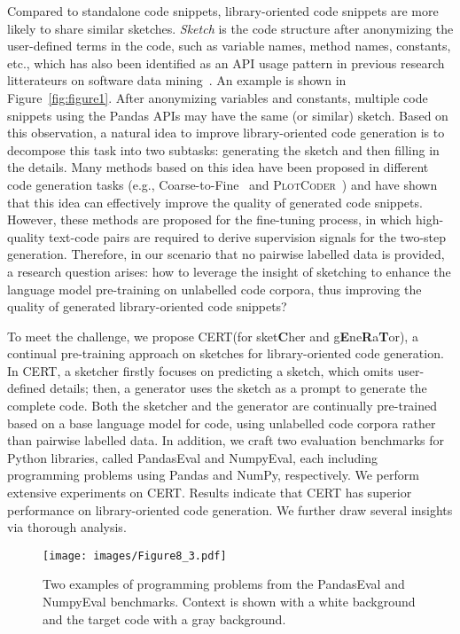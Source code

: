 \documentclass{article}
\newcommand{\cert}{\textsc{CERT}\xspace}
\newcommand{\peval}{PandasEval\xspace}
\newcommand{\neval}{NumpyEval\xspace}
\newcommand{\pandas}{Pandas\xspace}
\newcommand{\numpy}{NumPy\xspace}
\begin{document}
Compared to standalone code snippets, library-oriented code snippets are more likely to share similar sketches.
\emph{Sketch} is the code structure after anonymizing the user-defined terms in the code, such as variable names, method names, constants, etc., which has also been identified as an API usage pattern in previous research litterateurs on software data mining~\cite{ZhongECOOP2009,Wang2013-MSR,NIU2017127}.
An example is shown in Figure~\ref{fig:figure1}. After anonymizing variables and constants, multiple code snippets using the \pandas APIs may have the same (or similar) sketch.
Based on this observation, a natural idea to improve library-oriented code generation is to decompose this task into two subtasks: generating the sketch and then filling in the details.
Many methods based on this idea have been proposed in different code generation tasks (e.g., Coarse-to-Fine~\cite{dong2018coarse} and \textsc{PlotCoder}~\cite{chen2021plotcoder}) and have shown that this idea can effectively improve the quality of generated code snippets.
However, these methods are proposed for the fine-tuning process, in which high-quality text-code pairs are required to derive supervision signals for the two-step generation.
Therefore, in our scenario that no pairwise labelled data is provided, a research question arises: how to leverage the insight of sketching to enhance the language model pre-training on unlabelled code corpora, thus improving the quality of generated library-oriented code snippets?

To meet the challenge, we propose \cert (for sket\textbf{C}her and  g\textbf{E}ne\textbf{R}a\textbf{T}or), a continual pre-training approach on sketches for library-oriented code generation. In \cert, a sketcher firstly focuses on predicting a sketch, which omits user-defined details; then, a generator uses the sketch as a prompt to generate the complete code. Both the sketcher and the generator are continually pre-trained based on a base language model for code, using unlabelled code corpora rather than pairwise labelled data. In addition, we craft two evaluation benchmarks for Python libraries, called \peval and \neval,  each including  programming problems using \pandas and \numpy, respectively. 
We perform extensive experiments on \cert. 
Results indicate that \cert has superior performance on library-oriented code generation.
We further draw several insights via thorough analysis. 

\begin{figure}[t] 
    \small
    \centering
    \texttt{[image: images/Figure8\_3.pdf]}
\caption{Two examples of programming problems from the \peval and \neval benchmarks. Context is shown with a white background and the target code with a gray background.}
    \label{fig:examples}
\end{figure}
\end{document}
